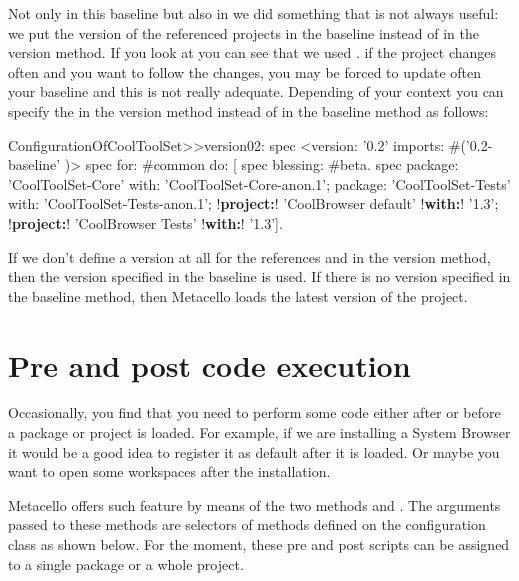 \documentclass[a4paper,10pt,twoside]{book}
\begin{document}
Not only in this baseline but also in  we did something that is not always useful: we put the version of the referenced projects in the baseline instead of in the version method. If you look at  you can see that we used . if the project changes often and you want to follow the changes, you may be forced to update often your baseline and this is not really adequate. Depending of your context you can specify the  in the version method instead of in the baseline method as follows: 

\begin{code}{}
ConfigurationOfCoolToolSet>>version02: spec 
       <version: '0.2' imports: #('0.2-baseline' )>
       spec for: #common do: [
              spec blessing: #beta.
              spec 
                     package: 'CoolToolSet-Core' with: 'CoolToolSet-Core-anon.1';
                     package: 'CoolToolSet-Tests' with: 'CoolToolSet-Tests-anon.1';
                     !\textbf{project:}! 'CoolBrowser default' !\textbf{with:}! '1.3';
                     !\textbf{project:}! 'CoolBrowser Tests' !\textbf{with:}! '1.3'].
\end{code}

If we don't define a version at all for the references   and  in the version method, then the version specified in the baseline is used. If there is no version specified in the baseline method, then Metacello loads the latest version of the project.

\section{Pre and post code execution}

Occasionally, you find that you need to perform some code either after or before a package or project is loaded. For example, if we are installing a System Browser it would be a good idea to register it as default after it is loaded. Or maybe you want to open some workspaces after the installation. 

Metacello offers such feature by means of the two methods  and .  The arguments passed to these methods are selectors of methods defined on the configuration class as shown below. For the moment, these pre and post scripts can be assigned to a single package or a whole project. 
\end{document}
